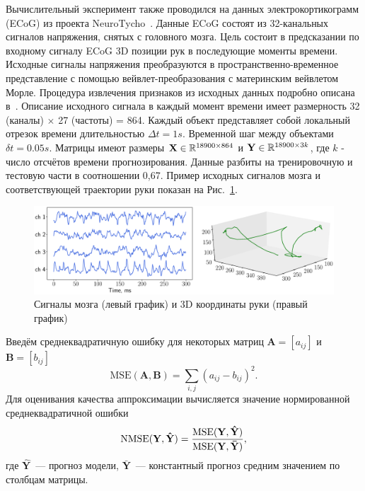 Вычислительный эксперимент также проводился на данных электрокортикограмм (ECoG) из проекта NeuroTycho~\cite{shimoda2012decoding}.
Данные ECoG состоят из 32-канальных сигналов напряжения, снятых с головного мозга.
Цель состоит в предсказании по входному сигналу ECoG 3D позиции рук в последующие моменты времени.
Исходные сигналы напряжения преобразуются в пространственно-временное представление с помощью вейвлет-преобразования с материнским вейвлетом Морле.
Процедура извлечения признаков из исходных данных подробно описана в~\cite{chao2010long,eliseyev2016penalized}.
Описание исходного сигнала в каждый момент времени имеет размерность 32 (каналы) $\times $ 27 (частоты) = 864.
Каждый объект представляет собой локальный отрезок времени длительностью $\Delta t = 1s$. 
Временной шаг между объектами $\delta t = 0.05 s$.
Матрицы имеют размеры $\mathbf{X} \in \mathbb{R}^{18900 \times 864}$ и $\mathbf{Y} \in \mathbb{R}^{18900 \times 3k}$, где $k$ - число отсчётов времени прогнозирования.
Данные разбиты на тренировочную и тестовую части в соотношении 0,67. 
Пример исходных сигналов мозга и соответствующей траектории руки показан на Рис.~\ref{ch2:fig:ecog_data}.

\begin{figure}[ht]
	\centering
	\includegraphics[width=\linewidth]{figs/ch2/ecog_data}
	\caption{Сигналы мозга (левый график) и 3D координаты руки (правый график)}
	\label{ch2:fig:ecog_data}
\end{figure}

Введём среднеквадратичную ошибку для некоторых матриц $\mathbf{A} = [a_{ij}]$ и $\mathbf{B} = [b_{ij}]$
\[
\text{MSE} (\mathbf{A}, \mathbf{B}) = \sum_{i,j} (a_{ij} - b_{ij})^2.
\]
Для оценивания качества аппроксимации вычисляется значение нормированной среднеквадратичной ошибки
\begin{equation}
\text{NMSE}(\mathbf{Y},  \mathbf{\hat{Y}}) = \frac{\text{MSE} (\mathbf{Y}, \mathbf{\hat{Y}})}{\text{MSE} (\mathbf{Y}, \mathbf{\bar{Y}})},
\label{ch1:eq:nmse}
\end{equation}
где $\mathbf{\hat{Y}}$~--- прогноз модели, $\mathbf{\bar{Y}}$~--- константный прогноз средним значением по столбцам матрицы.

